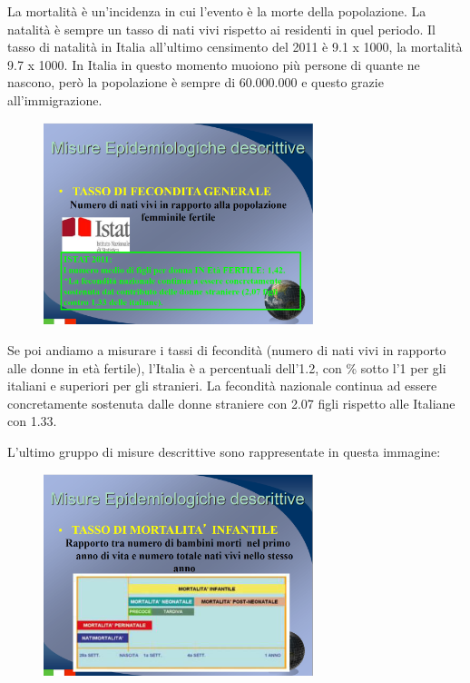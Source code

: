 La mortalità è un'incidenza in cui l'evento è la morte della
popolazione. La natalità è sempre un tasso di nati vivi rispetto ai
residenti in quel periodo. Il tasso di natalità in Italia all'ultimo
censimento del 2011 è 9.1 x 1000, la mortalità 9.7 x 1000. In Italia in
questo momento muoiono più persone di quante ne nascono, però la
popolazione è sempre di 60.000.000 e questo grazie all'immigrazione.

\begin{figure}[!ht]
\centering
	\includegraphics[width=0.7\textwidth]{03/image12.png}
\end{figure}

Se poi andiamo a misurare i tassi di fecondità (numero di nati vivi in
rapporto alle donne in età fertile), l'Italia è a percentuali dell'1.2,
con \% sotto l'1 per gli italiani e superiori per gli stranieri. La
fecondità nazionale continua ad essere concretamente sostenuta dalle
donne straniere con 2.07 figli rispetto alle Italiane con 1.33.

L'ultimo gruppo di misure descrittive sono rappresentate in questa
immagine:

\begin{figure}[!ht]
\centering
	\includegraphics[width=0.7\textwidth]{03/image13.png}
\end{figure}

